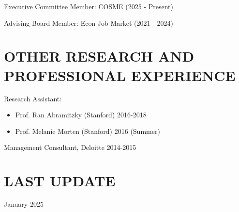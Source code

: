 \documentclass[margin]{res} %
\begin{document}
\begin{resume}
Executive Committee Member: COSME (2025 - Present)

Advising Board Member: Econ Job Market (2021 - 2024)

 
\section{OTHER RESEARCH AND PROFESSIONAL EXPERIENCE}
 Research Assistant:
\begin{itemize}
	\item Prof. Ran Abramitzky (Stanford) \hfill 2016-2018
	\item Prof. Melanie Morten (Stanford) \hfill 2016 (Summer)
\end{itemize}
 
 Management Consultant, Deloitte \hfill 2014-2015 

\section{LAST UPDATE} 
January 2025

\end{resume}
\end{document}
